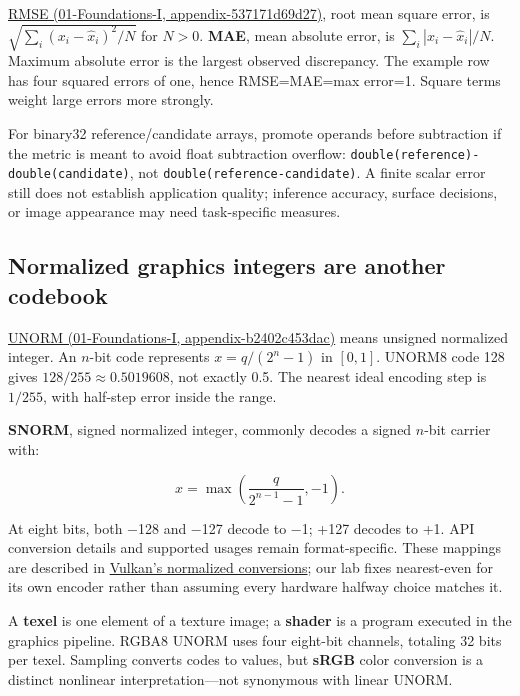 \href{../01-Foundations-I/main.pdf\#nameddest=appendix-537171d69d27}{RMSE (01-Foundations-I, appendix-537171d69d27)}, root mean square error, is \(\sqrt{\sum_i(x_i-\widehat x_i)^2/N}\) for \(N>0\). \textbf{MAE}, mean absolute error, is \(\sum_i|x_i-\widehat x_i|/N\). Maximum absolute error is the largest observed discrepancy. The example row has four squared errors of one, hence RMSE=MAE=max error=1. Square terms weight large errors more strongly.

For binary32 reference/candidate arrays, promote operands before subtraction if the metric is meant to avoid float subtraction overflow: \texttt{double(reference)-double(candidate)}, not \texttt{double(reference-candidate)}. A finite scalar error still does not establish application quality; inference accuracy, surface decisions, or image appearance may need task-specific measures.

\subsection{Normalized graphics integers are another codebook}\label{05-engine-i-ch001-normalized-graphics-integers-are-another-codebook}

\href{../01-Foundations-I/main.pdf\#nameddest=appendix-b2402c453dac}{UNORM (01-Foundations-I, appendix-b2402c453dac)} means unsigned normalized integer. An \(n\)-bit code represents \(x=q/(2^n-1)\) in \([0,1]\). UNORM8 code 128 gives \(128/255\approx0.5019608\), not exactly 0.5. The nearest ideal encoding step is \(1/255\), with half-step error inside the range.

\textbf{SNORM}, signed normalized integer, commonly decodes a signed \(n\)-bit carrier with:

\[
x=\max\!\left(\frac{q}{2^{n-1}-1},-1\right).
\]

At eight bits, both −128 and −127 decode to −1; +127 decodes to +1. API conversion details and supported usages remain format-specific. These mappings are described in \href{https://docs.vulkan.org/spec/latest/chapters/fundamentals.html\#fundamentals-fixedfpconv}{Vulkan's normalized conversions}; our lab fixes nearest-even for its own encoder rather than assuming every hardware halfway choice matches it.

A \textbf{texel} is one element of a texture image; a \textbf{shader} is a program executed in the graphics pipeline. RGBA8 UNORM uses four eight-bit channels, totaling 32 bits per texel. Sampling converts codes to values, but \textbf{sRGB} color conversion is a distinct nonlinear interpretation---not synonymous with linear UNORM.

